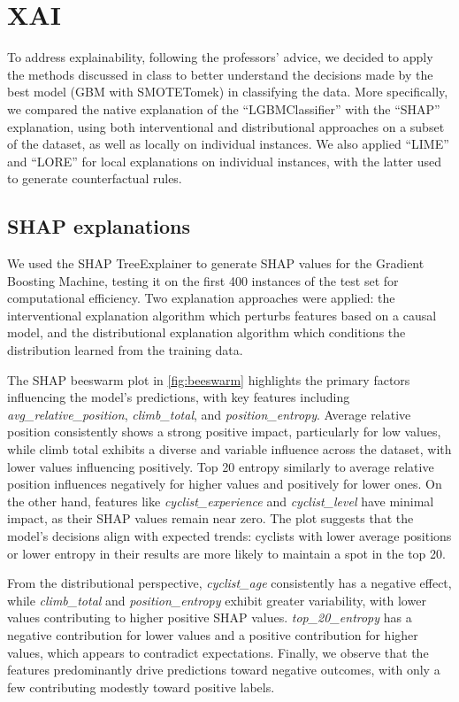 \section{XAI}
To address explainability, following the professors' advice, we decided to apply the methods discussed in class to better understand the decisions made by the best model (GBM with SMOTETomek) in classifying the data.
More specifically, we compared the native explanation of the \enquote{LGBMClassifier} with the \enquote{SHAP} explanation, using both interventional and distributional approaches on a subset of the dataset, as well as locally on individual instances. We also applied \enquote{LIME} and \enquote{LORE} for local explanations on individual instances, with the latter used to generate counterfactual rules.

\subsection{SHAP explanations}

We used the SHAP TreeExplainer to generate SHAP values for the Gradient Boosting Machine, testing it on the first 400 instances of the test set for computational efficiency. Two explanation approaches were applied: the interventional explanation algorithm which perturbs features based on a causal model, and the distributional explanation algorithm which conditions the distribution learned from the training data.

The SHAP beeswarm plot in \autoref{fig:beeswarm} highlights the primary factors influencing the model's predictions, with key features including \textit{avg\_relative\_position}, \textit{climb\_total}, and \textit{position\_entropy}. Average relative position consistently shows a strong positive impact, particularly for low values, while climb total exhibits a diverse and variable influence across the dataset, with lower values influencing positively. Top 20 entropy similarly to average relative position influences negatively for higher values and positively for lower ones. On the other hand, features like \textit{cyclist\_experience} and \textit{cyclist\_level} have minimal impact, as their SHAP values remain near zero. 
The plot suggests that the model's decisions align with expected trends: cyclists with lower average positions or lower entropy in their results are more likely to maintain a spot in the top 20.

From the distributional perspective, \textit{cyclist\_age} consistently has a negative effect, while \textit{climb\_total} and \textit{position\_entropy} exhibit greater variability, with lower values contributing to higher positive SHAP values. \textit{top\_20\_entropy} has a negative contribution for lower values and a positive contribution for higher values, which appears to contradict expectations. Finally, we observe that the features predominantly drive predictions toward negative outcomes, with only a few contributing modestly toward positive labels.

